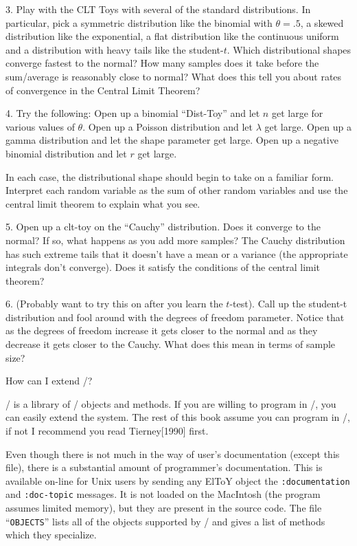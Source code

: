 \item{3.} Play with the CLT Toys with several of the standard
distributions.  In particular, pick a symmetric distribution like the
binomial with $\theta=.5$, a skewed distribution like the exponential, a
flat distribution like the continuous uniform and a distribution with
heavy tails like the student-$t$.  Which distributional shapes converge
fastest to the normal?  How many samples does it take before the
sum/average is reasonably close to normal?  What does this tell you
about rates of convergence in the Central Limit Theorem?

\item{4.}  Try the following:
 Open up a binomial ``Dist-Toy'' and let $n$ get large
for various values of $\theta$.
 Open up a Poisson distribution and let $\lambda$ get
large.
 Open up a gamma distribution and let the shape parameter
get large.
 Open up a negative binomial distribution and let $r$ get
large.  
\item{}In each case, the distributional shape should begin to take on
a familiar form.  Interpret each random variable as the sum of other
random variables and use the central limit theorem to explain what you
see.

\item{5.} Open up a clt-toy on the ``Cauchy'' distribution.  Does it
converge to the normal?  If so, what happens as you add more samples?
The Cauchy distribution has such extreme tails that it doesn't have a
mean or a variance (the appropriate integrals don't converge).  Does
it satisfy the conditions of the central limit theorem?

\item{6.} (Probably want to try this on after you learn the $t$-test).
Call up the student-t distribution and fool around with the degrees of
freedom parameter.  Notice that as the degrees of freedom increase it
gets closer to the normal and as they decrease it gets closer to the
Cauchy.  What does this mean in terms of sample size?


  How can I extend \eltoy/?

\eltoy/ is a library of \xlispstat/ objects and methods.  If you are
willing to program in \xlispstat/, you can easily extend the system.
The rest of this book assume you can program in \xlispstat/, if not I
recommend you read Tierney[1990] first.

Even though there is not much in the way of user's documentation
(except this file), there is a substantial amount of programmer's
documentation.  This is available on-line for Unix users by sending
any ElToY object the {\tt :documentation\/} and {\tt :doc-topic\/}
messages.  It is not loaded on the MacIntosh (the program assumes
limited memory), but they are present in the source code.  The file
``{\tt OBJECTS\/}'' lists all of the objects supported by \eltoy/ and
gives a list of methods which they specialize.



